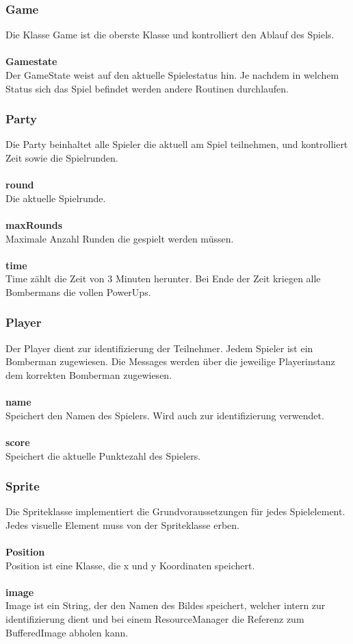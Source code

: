 \documentclass[11pt]{scrartcl}
\begin{document}
\subsubsection{Game}
\label{sec:Game}
Die Klasse Game ist die oberste Klasse und kontrolliert den Ablauf des Spiels. \\\\
\textbf{Gamestate} \\
Der GameState weist auf den aktuelle Spielestatus hin. Je nachdem in welchem Status sich das Spiel befindet werden andere Routinen durchlaufen.

\subsubsection{Party}
\label{sec:party}
Die Party beinhaltet alle Spieler die aktuell am Spiel teilnehmen, und kontrolliert Zeit sowie die Spielrunden.
\\\\
\textbf{round}\\
Die aktuelle Spielrunde.
\\\\
\textbf{maxRounds}\\
Maximale Anzahl Runden die gespielt werden müssen.
\\\\
\textbf{time}\\
Time zählt die Zeit von 3 Minuten herunter. Bei Ende der Zeit kriegen alle Bombermans die vollen PowerUps.

\subsubsection{Player}
\label{sec:Player}
Der Player dient zur identifizierung der Teilnehmer. Jedem Spieler ist ein Bomberman zugewiesen. Die Messages werden über die jeweilige Playerinstanz dem korrekten Bomberman zugewiesen.
\\\\
\textbf{name}\\
Speichert den Namen des Spielers. Wird auch zur identifizierung verwendet.
\\\\
\textbf{score}\\
Speichert die aktuelle Punktezahl des Spielers.

\newpage

\subsubsection{Sprite}
\label{sec:Sprite}
Die Spriteklasse implementiert die Grundvoraussetzungen für jedes Spielelement. Jedes visuelle Element muss von der Spriteklasse erben.
\\\\
\textbf{Position}\\
Position ist eine Klasse, die x und y Koordinaten speichert.
\\\\
\textbf{image}\\
Image ist ein String, der den Namen des Bildes speichert, welcher intern zur identifizierung dient und bei einem ResourceManager die Referenz zum BufferedImage abholen kann.
\end{document}
